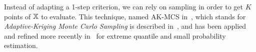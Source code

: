 \documentclass[../../Main_ManuscritThese.tex]{subfiles}
\begin{document}

Instead of adapting a 1-step criterion, we can rely on sampling in order
to get $K$ points of $\mathbb{X}$ to evaluate.  This technique, named
AK-MCS in~\cite{echard_ak-mcs_2011}, which stands for
\emph{Adaptive-Kriging Monte Carlo Sampling} is described
in~\cite{dubourg_reliability-based_2011}, and has been applied and
refined more recently
in~\cite{schobi_rare_2017,razaaly_quantile-based_2020,razaaly_rare_2019}
for extreme quantile and small probability estimation.
\end{document}
